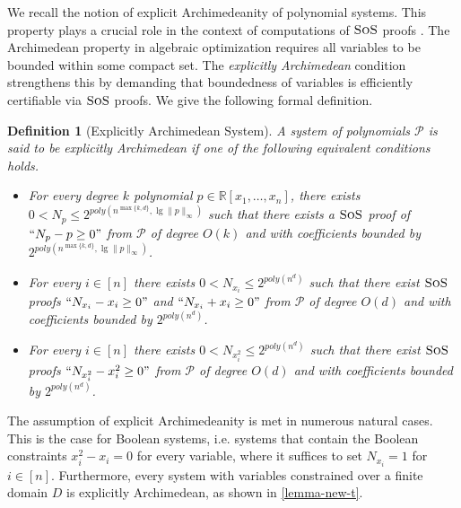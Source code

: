 \documentclass[11pt]{article}
\newcommand{\sos}{\text{\sc{SoS}}}
\newcommand{\1}{\textbf{1}}
\newtheorem{definition}[theorem]{Definition}
\begin{document}
We recall the notion of explicit Archimedeanity of polynomial systems. This property plays a crucial role in the context of computations of $\sos$ proofs \cite{JoszH16,Laurent2009}. The Archimedean property in algebraic optimization requires all variables to be bounded within some compact set. The \emph{explicitly Archimedean} condition strengthens this by demanding that boundedness of variables is efficiently certifiable via $\sos$ proofs. We give the following formal definition.

\begin{definition}[Explicitly Archimedean System]
    A system of polynomials $\mathcal{P}$ is said to be \emph{explicitly Archimedean} if one of the following equivalent conditions holds.
    \begin{itemize}
        \item \label{def:exp_arch} For every degree $k$ polynomial $p\in \mathbb{R}[x_1, \dots, x_n]$, there exists $0<N_p \leq 2^{poly(n^{\max\{k,d\}}, \lg \|p\|_{\infty})}$ such that there exists a $\sos$ proof of $``N_p-p\geq 0"$ from $\mathcal{P}$ of degree $O(k)$ and with coefficients bounded by $2^{poly(n^{\max\{k,d\}}, \lg \|p\|_{\infty})}$.
        \item \label{prop:bounded_variables_archimedeanity} For every $i \in [n]$ there exists $0 < N_{x_i} \leq 2^{poly(n^d)}$ such that there exist $\sos$ proofs $``N_{x_i} - x_i \geq 0"$ and $``N_{x_i} + x_i \geq 0"$ from $\mathcal{P}$ of degree $O(d)$ and with coefficients bounded by $2^{poly(n^d)}$.
        \item For every $i \in [n]$ there exists $0 < N_{x_i^2} \leq 2^{poly(n^d)}$ such that there exist $\sos$ proofs $``N_{x_i^2} - x_i^2 \geq 0"$ from $\mathcal{P}$ of degree $O(d)$ and with coefficients bounded by $2^{poly(n^d)}$.
    \end{itemize}
\end{definition}

The assumption of explicit Archimedeanity is met in numerous natural cases. This is the case for Boolean systems, i.e. systems that contain the Boolean constraints $x_i^2 - x_i = 0$ for every variable, where it suffices to set $N_{x_i} = 1$ for $i \in [n]$. Furthermore, every system with variables constrained over a finite domain $D$ is explicitly Archimedean, as shown in \cref{lemma-new-t}.

\end{document}
